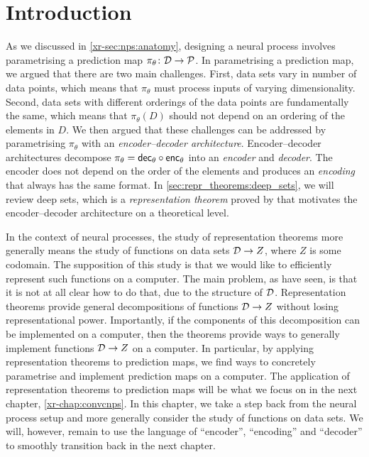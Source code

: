 \documentclass[12pt, twoside]{report}
\newcommand{\xrprefix}[1]{xr-#1}
\begin{document}
\section{Introduction}
\label{sec:repr_theorems:introduction}

As we discussed in \cref{\xrprefix{sec:nps:anatomy}}, designing a neural process involves parametrising a prediction map $\pi_\theta \colon \mathcal{D} \to \mathcal{P}$.
In parametrising a prediction map, we argued that there are two main challenges.
First, data sets vary in number of data points, which means that $\pi_\theta$ must process inputs of varying dimensionality.
Second, data sets with different orderings of the data points are fundamentally the same, which means that $\pi_\theta(D)$ should not depend on an ordering of the elements in $D$.
We then argued that these challenges can be addressed by parametrising $\pi_\theta$ with an \emph{encoder--decoder architecture}.
Encoder--decoder architectures
decompose $\pi_\theta  = \mathsf{dec}_\theta \circ \mathsf{enc}_\theta$ into an \emph{encoder} and \emph{decoder}.
The encoder does not depend on the order of the elements and produces an \emph{encoding} that always has the same format. 
In \cref{sec:repr_theorems:deep_sets}, we will review deep sets, which is a \emph{representation theorem} proved by \textcite{Zaheer:2017:Deep_Sets} that motivates the encoder--decoder architecture on a theoretical level.

In the context of neural processes, the study of representation theorems more generally means the study of functions on data sets $\mathcal{D} \to Z$, where $Z$ is some codomain.
The supposition of this study is that we would like to efficiently represent such functions on a computer.
The main problem, as have seen, is that it is not at all clear how to do that, due to the structure of $\mathcal{D}$.
Representation theorems provide general decompositions of functions $\mathcal{D} \to Z$ without losing representational power.
Importantly, if the components of this decomposition can be implemented on a computer, then the theorems provide ways to generally implement functions $\mathcal{D} \to Z$ on a computer.
In particular, by applying representation theorems to prediction maps, we find ways to concretely parametrise and implement prediction maps on a computer.
The application of representation theorems to prediction maps will be what we focus on in the next chapter, \cref{\xrprefix{chap:convcnps}}.
In this chapter, we take a step back from the neural process setup and more generally consider the study of functions on data sets.
We will, however, remain to use the language of ``encoder'', ``encoding'' and ``decoder'' to smoothly transition back in the next chapter.
\end{document}
